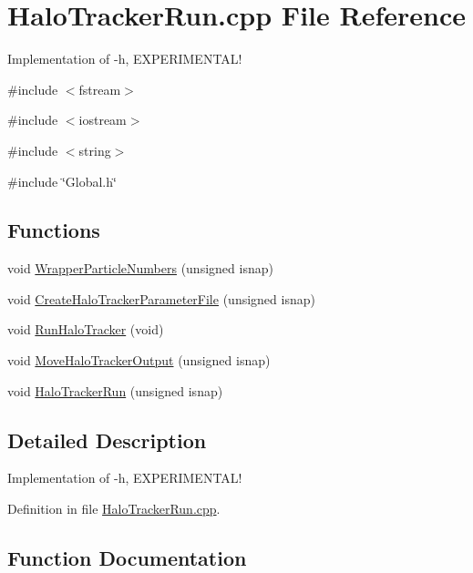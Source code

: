 \section{HaloTrackerRun.cpp File Reference}
\label{HaloTrackerRun_8cpp}


Implementation of -\/h, EXPERIMENTAL!  


{\ttfamily \#include $<$fstream$>$}\par
{\ttfamily \#include $<$iostream$>$}\par
{\ttfamily \#include $<$string$>$}\par
{\ttfamily \#include \char`\"{}Global.h\char`\"{}}\par
\subsection*{Functions}
\begin{DoxyCompactItemize}
\item 
void \hyperlink{HaloTrackerRun_8cpp_a35514626dd97634821c7303fc640bc02}{WrapperParticleNumbers} (unsigned isnap)
\item 
void \hyperlink{HaloTrackerRun_8cpp_adb8e2d3e453485603ac1ddb77d669cd2}{CreateHaloTrackerParameterFile} (unsigned isnap)
\item 
void \hyperlink{HaloTrackerRun_8cpp_aa0ead2fefc5a3e2e7ad0a06648dd7a3e}{RunHaloTracker} (void)
\item 
void \hyperlink{HaloTrackerRun_8cpp_a645890dfd1a430544abd07a06a3b5224}{MoveHaloTrackerOutput} (unsigned isnap)
\item 
void \hyperlink{HaloTrackerRun_8cpp_a9cb4854254f44c5f21198856836ba77c}{HaloTrackerRun} (unsigned isnap)
\end{DoxyCompactItemize}


\subsection{Detailed Description}
Implementation of -\/h, EXPERIMENTAL! 

Definition in file \hyperlink{HaloTrackerRun_8cpp_source}{HaloTrackerRun.cpp}.



\subsection{Function Documentation}
